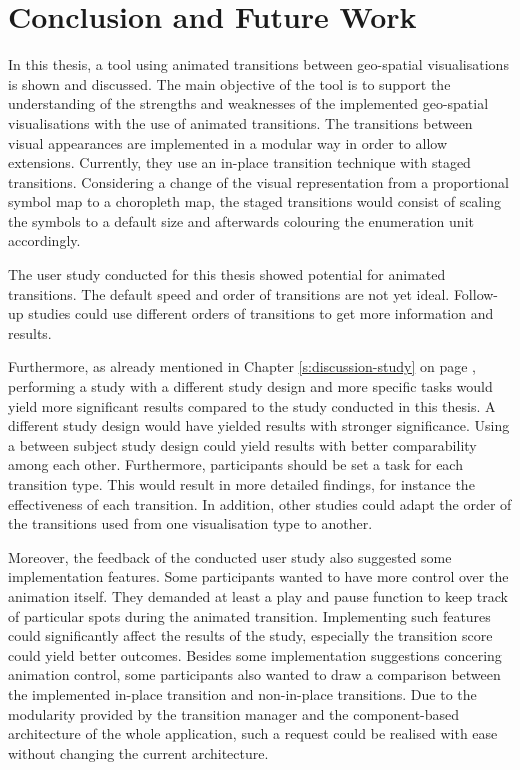 \section{Conclusion and Future Work}
\label{s:outlook}

In this thesis, a tool using animated transitions between geo-spatial visualisations is shown and discussed. The main objective of the tool is to support the understanding of the strengths and weaknesses of the implemented geo-spatial visualisations with the use of animated transitions. The transitions between visual appearances are implemented in a modular way in order to allow extensions. Currently, they use an in-place transition technique with staged transitions. Considering a change of the visual representation from a proportional symbol map to a choropleth map, the staged transitions would consist of scaling the symbols to a default size and afterwards colouring the enumeration unit accordingly.

The user study conducted for this thesis showed potential for animated transitions. The default speed and order of transitions are not yet ideal. Follow-up studies could use different orders of transitions to get more information and results.

Furthermore, as already mentioned in Chapter \ref{s:discussion-study} on page \pageref{s:discussion-study}, performing a study with a different study design and more specific tasks would yield more significant results compared to the study conducted in this thesis. A different study design would have yielded results with stronger significance. Using a between subject study design could yield results with better comparability among each other. Furthermore, participants should be set a task for each transition type. This would result in more detailed findings, for instance the effectiveness of each transition. In addition, other studies could adapt the order of the transitions used from one visualisation type to another.

Moreover, the feedback of the conducted user study also suggested some implementation features. Some participants wanted to have more control over the animation itself. They demanded at least a play and pause function to keep track of particular spots during the animated transition. Implementing such features could significantly affect the results of the study, especially the transition score could yield better outcomes. Besides some implementation suggestions concering animation control, some participants also wanted to draw a comparison between the implemented in-place transition and non-in-place transitions. Due to the modularity provided by the transition manager and the component-based architecture of the whole application, such a request could be realised with ease without changing the current architecture.

